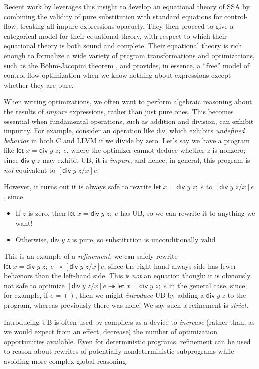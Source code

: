 \documentclass[acmsmall,screen,review]{acmart}
\newcommand{\ms}[1]{\ensuremath{\mathsf{#1}}}
\newcommand{\letexpr}[3]{\ensuremath{\ms{let}\;#1 = #2;\;#3}}
\newcommand{\tref}{\twoheadrightarrow}
\begin{document}
Recent work by \citet{ghalayini-24-ssa-densem-arxiv} leverages this insight to develop an equational
theory of SSA by combining the validity of pure substitution with standard equations for
control-flow, treating all impure expressions opaquely. They then proceed to give a categorical
model for their equational theory, with respect to which their equational theory is both sound and
complete. Their equational theory is rich enough to formalize a wide variety of program
transformations and optimizations, such as the B\"ohm-Jacopini theorem \cite{bohm-jacopini}, and
provides, in essence, a ``free'' model of control-flow optimization when we know nothing about
expressions except whether they are pure.

When writing optimizations, we often want to perform algebraic reasoning about the results of
\emph{impure} expressions, rather than just pure ones. This becomes essential when fundamental
operations, such as addition and division, can exhibit impurity. For example, consider an operation
like \ms{div}, which exhibits \emph{undefined behavior} in both C and LLVM if we divide by zero.
Let's say we have a program like $\letexpr{x}{\ms{div}\;y\;z}{e}$, where the optimizer cannot deduce
whether $z$ is nonzero; since $\ms{div}\;y\;z$ may exhibit UB, it is \emph{impure}, and hence, in
general, this program is \emph{not} equivalent to $[\ms{div}\;y\;z/x]e$.

However, it turns out it is always safe to rewrite $\letexpr{x}{\ms{div}\;y\;z}{e}$ to
$[\ms{div}\;y\;z/x]e$, since
\begin{itemize}
  \item If $z$ is zero, then $\letexpr{x}{\ms{div}\;y\;z}{e}$ has UB, so we can rewrite it to
  anything we want!
  \item Otherwise, $\ms{div}\;y\;z$ is pure, so substitution is unconditionally valid
\end{itemize}
This is an example of a \emph{refinement}, we can safely rewrite $\letexpr{x}{\ms{div}\;y\;z}{e}
\tref [\ms{div}\;y\;z/x]e$, since the right-hand always side has fewer behaviors than the left-hand
side. This is \emph{not} an equation though: it is obviously not safe to optimize
$[\ms{div}\;y\;z/x]e \tref \letexpr{x}{\ms{div}\;y\;z}{e}$ in the general case, since, for example,
if $e = ()$, then we might \emph{introduce} UB by adding a $\ms{div}\;y\;z$ to the program, whereas
previously there was none! We say such a refinement is \emph{strict}.

Introducing UB is often used by compilers as a device to \emph{increase} (rather than, as we would
expect from an effect, decrease) the number of optimization opportunities available. Even for
deterministic programs, refinement can be used to reason about rewrites of potentially
nondeterministic subprograms while avoiding more complex global reasoning.
\end{document}

